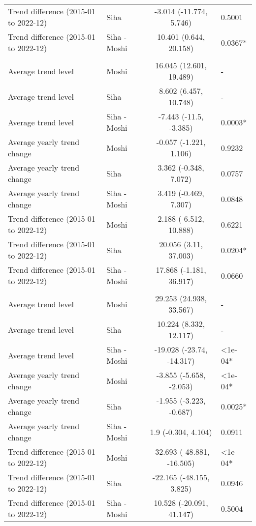 \begin{longtable}{l|lcl}
Trend difference (2015-01 to 2022-12) & Siha & -3.014 (-11.774, 5.746) & 0.5001 \\ 
Trend difference (2015-01 to 2022-12) & Siha - Moshi & 10.401 (0.644, 20.158) & 0.0367* \\ 
\midrule\addlinespace[2.5pt]
\multicolumn{4}{l}{Substance Abuse} \\[2.5pt] 
\midrule\addlinespace[2.5pt]
Average trend level & Moshi & 16.045 (12.601, 19.489) & - \\ 
Average trend level & Siha & 8.602 (6.457, 10.748) & - \\ 
Average trend level & Siha - Moshi & -7.443 (-11.5, -3.385) & 0.0003* \\ 
Average yearly trend change & Moshi & -0.057 (-1.221, 1.106) & 0.9232 \\ 
Average yearly trend change & Siha & 3.362 (-0.348, 7.072) & 0.0757 \\ 
Average yearly trend change & Siha - Moshi & 3.419 (-0.469, 7.307) & 0.0848 \\ 
Trend difference (2015-01 to 2022-12) & Moshi & 2.188 (-6.512, 10.888) & 0.6221 \\ 
Trend difference (2015-01 to 2022-12) & Siha & 20.056 (3.11, 37.003) & 0.0204* \\ 
Trend difference (2015-01 to 2022-12) & Siha - Moshi & 17.868 (-1.181, 36.917) & 0.0660 \\ 
\midrule\addlinespace[2.5pt]
\multicolumn{4}{l}{Tuberculosis} \\[2.5pt] 
\midrule\addlinespace[2.5pt]
Average trend level & Moshi & 29.253 (24.938, 33.567) & - \\ 
Average trend level & Siha & 10.224 (8.332, 12.117) & - \\ 
Average trend level & Siha - Moshi & -19.028 (-23.74, -14.317) & <1e-04* \\ 
Average yearly trend change & Moshi & -3.855 (-5.658, -2.053) & <1e-04* \\ 
Average yearly trend change & Siha & -1.955 (-3.223, -0.687) & 0.0025* \\ 
Average yearly trend change & Siha - Moshi & 1.9 (-0.304, 4.104) & 0.0911 \\ 
Trend difference (2015-01 to 2022-12) & Moshi & -32.693 (-48.881, -16.505) & <1e-04* \\ 
Trend difference (2015-01 to 2022-12) & Siha & -22.165 (-48.155, 3.825) & 0.0946 \\ 
Trend difference (2015-01 to 2022-12) & Siha - Moshi & 10.528 (-20.091, 41.147) & 0.5004 \\ 

\end{longtable}
